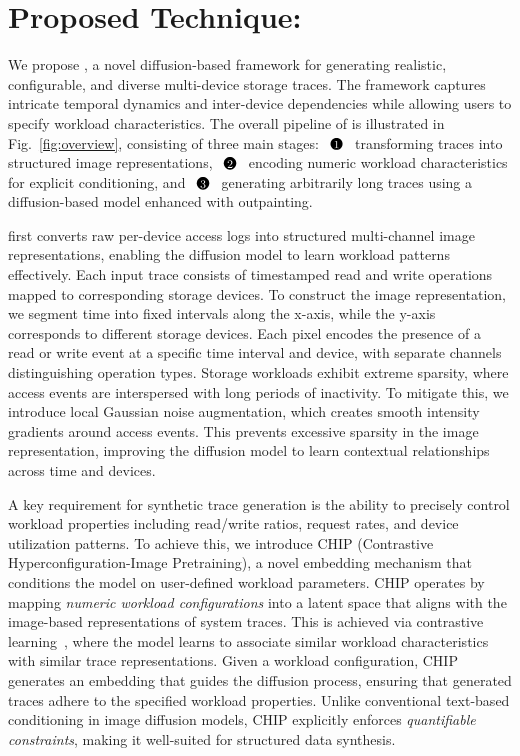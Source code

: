 \documentclass[
  manuscript=article,  %
  layout=preprint,  %
  year=20xx,
  volume=x,
]{extra/joas}
\begin{document}
\section{Proposed Technique: \Design}  
We propose \Design, a novel diffusion-based framework for generating realistic, configurable, and diverse multi-device storage traces. The framework captures intricate temporal dynamics and inter-device dependencies while allowing users to specify workload characteristics. The overall pipeline of \Design is illustrated in Fig.~\ref{fig:overview}, consisting of three main stages: $\invcircledast{1}$ transforming traces into structured image representations, $\invcircledast{2}$ encoding numeric workload characteristics for explicit conditioning, and $\invcircledast{3}$ generating arbitrarily long traces using a diffusion-based model enhanced with outpainting.

\Design first converts raw per-device access logs into structured multi-channel image representations, enabling the diffusion model to learn workload patterns effectively. Each input trace consists of timestamped read and write operations mapped to corresponding storage devices. To construct the image representation, we segment time into fixed intervals along the x-axis, while the y-axis corresponds to different storage devices. Each pixel encodes the presence of a read or write event at a specific time interval and device, with separate channels distinguishing operation types.  
Storage workloads exhibit extreme sparsity, where access events are interspersed with long periods of inactivity. To mitigate this, we introduce local Gaussian noise augmentation, which creates smooth intensity gradients around access events. This prevents excessive sparsity in the image representation, improving the diffusion model to learn contextual relationships across time and devices.  

A key requirement for synthetic trace generation is the ability to precisely control workload properties including read/write ratios, request rates, and device utilization patterns. To achieve this, we introduce CHIP (Contrastive Hyperconfiguration-Image Pretraining), a novel embedding mechanism that conditions the model on user-defined workload parameters.  
CHIP operates by mapping \textit{numeric workload configurations} into a latent space that aligns with the image-based representations of system traces. This is achieved via contrastive learning~\cite{clip}, where the model learns to associate similar workload characteristics with similar trace representations. Given a workload configuration, CHIP generates an embedding that guides the diffusion process, ensuring that generated traces adhere to the specified workload properties. Unlike conventional text-based conditioning in image diffusion models, CHIP explicitly enforces \textit{quantifiable constraints}, making it well-suited for structured data synthesis.  
\end{document}
